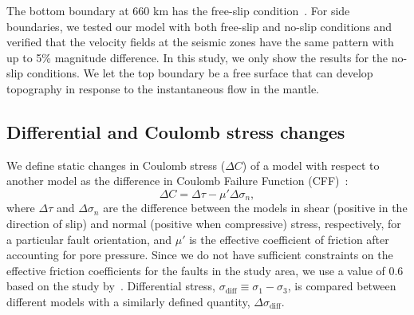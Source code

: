 \documentclass[draft,linenumbers]{agujournal2018}
\begin{document}
The bottom boundary at 660 km has the free-slip condition~\citep[e.g.,][]{arcay2007slab, billen2007rheologic, quinquis2011role}. For side boundaries, we tested our model with both free-slip and no-slip conditions and verified that the velocity fields at the seismic zones have the same pattern with up to 5\% magnitude difference. In this study, we only show the results for the no-slip conditions. We let the top boundary be a free surface that can develop topography in response to the instantaneous flow in the mantle. 

\subsection{Differential and Coulomb stress changes}
We define static changes in Coulomb stress ($\Delta C$) of a model with respect to another model as the difference in Coulomb Failure Function (CFF)~\citep{king1994static}:
%
\begin{equation}
    \Delta C = \Delta \tau - \mu' \Delta \sigma_n,
\end{equation}
%
where $\Delta \tau$ and $\Delta\sigma_n$ are the difference between the models in shear (positive in the direction of slip) and normal (positive when compressive) stress, respectively, for a particular fault orientation, and $\mu'$ is the effective coefficient of friction after accounting for pore pressure. Since we do not have sufficient constraints on the effective friction coefficients for the faults in the study area, we use a value of 0.6 based on the study by~\citet{hurd2012intraplate}. Differential stress, $\sigma_{\text{diff}} \equiv \sigma_{1}-\sigma_{3}$, is compared between different models with a similarly defined quantity, $\Delta \sigma_{\text{diff}}$.
\end{document}
